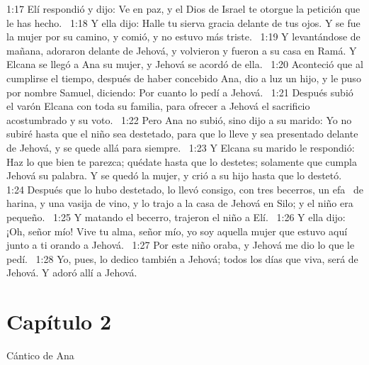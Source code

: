 1:17 Elí respondió y dijo: Ve en paz, y el Dios de Israel te otorgue la petición que le has hecho.  
1:18 Y ella dijo: Halle tu sierva gracia delante de tus ojos. Y se fue la mujer por su camino, y comió, y no estuvo más triste.  
1:19 Y levantándose de mañana, adoraron delante de Jehová, y volvieron y fueron a su casa en Ramá. Y Elcana se llegó a Ana su mujer, y Jehová se acordó de ella.  
1:20 Aconteció que al cumplirse el tiempo, después de haber concebido Ana, dio a luz un hijo, y le puso por nombre Samuel, diciendo: Por cuanto lo pedí a Jehová.  
1:21 Después subió el varón Elcana con toda su familia, para ofrecer a Jehová el sacrificio acostumbrado y su voto.  
1:22 Pero Ana no subió, sino dijo a su marido: Yo no subiré hasta que el niño sea destetado, para que lo lleve y sea presentado delante de Jehová, y se quede allá para siempre.  
1:23 Y Elcana su marido le respondió: Haz lo que bien te parezca; quédate hasta que lo destetes; solamente que cumpla Jehová su palabra. Y se quedó la mujer, y crió a su hijo hasta que lo destetó.  
1:24 Después que lo hubo destetado, lo llevó consigo, con tres becerros, un efa  de harina, y una vasija de vino, y lo trajo a la casa de Jehová en Silo; y el niño era pequeño.  
1:25 Y matando el becerro, trajeron el niño a Elí.  
1:26 Y ella dijo: ¡Oh, señor mío! Vive tu alma, señor mío, yo soy aquella mujer que estuvo aquí junto a ti orando a Jehová.  
1:27 Por este niño oraba, y Jehová me dio lo que le pedí.  
1:28 Yo, pues, lo dedico también a Jehová; todos los días que viva, será de Jehová. Y adoró allí a Jehová.  

\section*{Capítulo 2}

Cántico de Ana  

